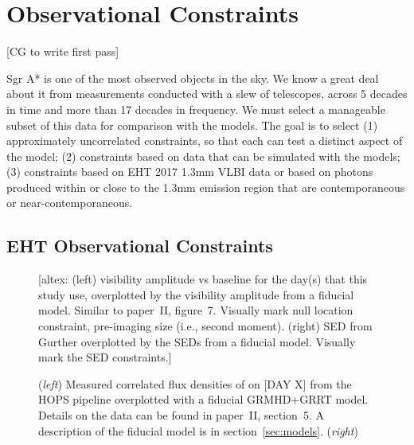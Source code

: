 \section{Observational Constraints}\label{sec:observations}

[CG to write first pass]

Sgr A* is one of the most observed objects in the sky.   We know a great deal about it from measurements conducted with a slew of telescopes, across 5 decades in time and more than 17 decades in frequency.  We must select a manageable subset of this data for comparison with the models.  The goal is to select (1) approximately uncorrelated constraints, so that each can test a distinct aspect of the model; (2) constraints based on data that can be simulated with the  models; (3) constraints based on EHT 2017 1.3mm VLBI data or based on photons produced within or close to the 1.3mm emission region that are contemporaneous or near-contemporaneous.


\subsection{EHT Observational Constraints}


\begin{figure*}
  \centering
  [altex: (left) visibility amplitude vs baseline for the day(s) that
    this study use, overplotted by the visibility amplitude from a
    fiducial model.
    Similar to paper~II, figure~7.
    Visually mark null location constraint, pre-imaging size (i.e.,
    second moment).
    (right) SED from Gurther overplotted by the SEDs from a fiducial
    model.
    Visually mark the SED constraints.]
  \caption{(\emph{left}) Measured correlated flux densities of \sgra
    on [DAY X] from the HOPS pipeline overplotted with a fiducial
    GRMHD+GRRT model.
    Details on the data can be found in paper~II, section~5.
    A description of the fiducial model is in
    section~\ref{sec:models}.
    (\emph{right}) }
  \label{fig:visibility}
\end{figure*}

